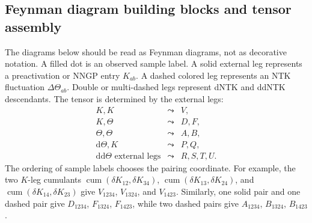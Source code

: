 \documentclass{article}
\newcommand{\cumul}{\operatorname{cum}}
\begin{document}
\subsection{Feynman diagram building blocks and tensor assembly}
\label{app:feynman-building-blocks}
The diagrams below should be read as Feynman diagrams, not as decorative notation. A filled dot is an observed sample label. A solid external leg represents a preactivation or NNGP entry \(K_{ab}\). A dashed colored leg represents an NTK fluctuation \(\Delta\Theta_{ab}\). Double or multi-dashed legs represent dNTK and ddNTK descendants. The tensor is determined by the external legs:
\vspace{-0.4em}
\[
\begin{array}{ccl}
K,K &\leadsto& V,\\
K,\Theta &\leadsto& D,F,\\
\Theta,\Theta &\leadsto& A,B,\\
\mathrm d\Theta,K &\leadsto& P,Q,\\
\mathrm{dd}\Theta \text{ external legs} &\leadsto& R,S,T,U.
\end{array}
\]
\vspace{0.2em}
The ordering of sample labels chooses the pairing coordinate. For example, the two \(K\)-leg cumulants \(\cumul(\delta K_{12},\delta K_{34})\), \(\cumul(\delta K_{13},\delta K_{24})\), and \(\cumul(\delta K_{14},\delta K_{23})\) give \(V_{1234}\), \(V_{1324}\), and \(V_{1423}\). Similarly, one solid pair and one dashed pair give \(D_{1234}\), \(F_{1324}\), \(F_{1423}\), while two dashed pairs give \(A_{1234}\), \(B_{1324}\), \(B_{1423}\).
\end{document}

